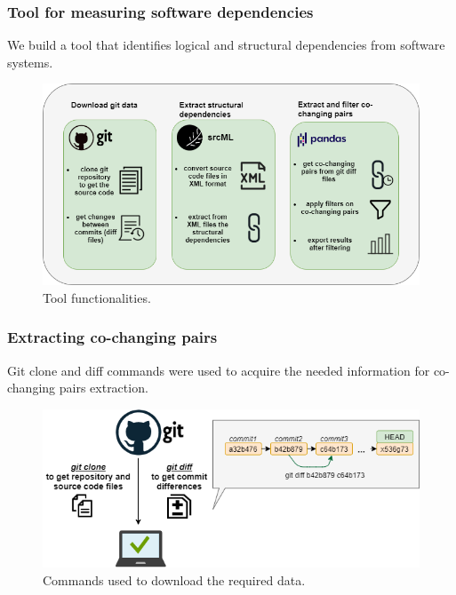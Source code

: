 \documentclass{beamer}
\begin{document}
 \begin{frame}
\frametitle{Tool for measuring software dependencies}
We build a tool that identifies logical and structural dependencies from software systems.
\begin{center}
     \begin{figure}
	\includegraphics[width=\textwidth]{tool_workflow.png}
	\caption{\label{fig:fig1}Tool functionalities.}
     \end{figure}
\end{center}
\end{frame}


 \begin{frame}
\frametitle{Extracting co-changing pairs}
Git clone and diff commands were used to acquire the needed information for co-changing pairs extraction.
\begin{center}
     \begin{figure}
	\includegraphics[width=\textwidth]{gitdata.png}
	\caption{\label{fig:fig1} Commands used to download the required data.}
     \end{figure}
\end{center}
\end{frame}
\end{document}

